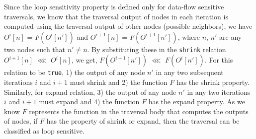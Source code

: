 Since the loop sensitivity property is defined only for data-flow sensitive
traversals, we know that the traversal output of nodes in each iteration is
computed using the traversal output of other nodes (possible neighbors), we have
$O^{i}[n]$ = $F(O^{i}[n'])$ and $O^{i+1}[n]$ = $F(O^{i+1}[n'])$, where $n$, $n'$
are any two nodes such that $n' \neq n$. By substituting these in the
\lstinline|shrink| relation $O^{i+1}[n]$ $\lll$ $O^{i}[n]$, we get,
$F(O^{i+1}[n'])$ $\lll$ $F(O^{i}[n'])$. For this relation to be
\lstinline|true|, 1) the output of any node $n'$ in any two subsequent
iterations $i$ and $i+1$ must shrink and 2) the function $F$ has the shrink
property. Similarly, for expand relation, 3) the output of any node $n'$ in any
two iterations $i$ and $i+1$ must expand and 4) the function $F$ has the expand
property.
As we know $F$ represents the function in the traversal body that computes the
outputs of nodes, if $F$ has the property of shrink or expand, then the
traversal can be classified as loop sensitive.
% 
% 
% 
% 


